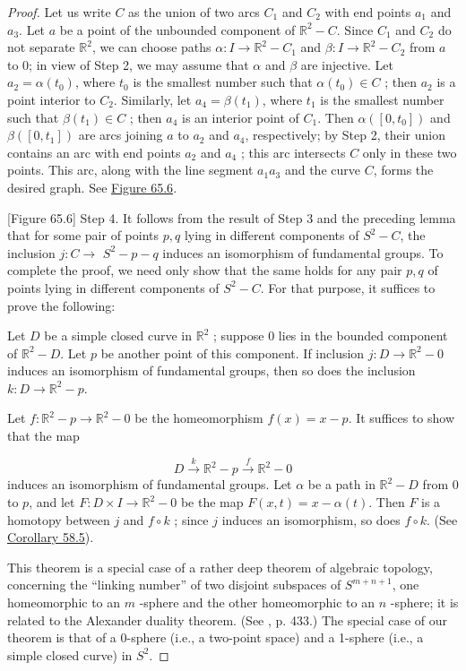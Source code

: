 \begin{proof}
Let us write \(C\) as the union of two arcs \(C_{1}\) and \(C_{2}\) with end points \(a_{1}\) and \(a_{3}\). Let \(a\) be a point of the unbounded component of \(\mathbb{R}^{2} - C\). Since \(C_{1}\) and \(C_{2}\) do not separate \(\mathbb{R}^{2}\), we can choose paths \(\alpha : I \rightarrow {\mathbb{R}}^{2} - C_{1}\) and \(\beta : I \rightarrow {\mathbb{R}}^{2} - C_{2}\) from \(a\) to 0; in view of Step 2, we may assume that \(\alpha\) and \(\beta\) are injective. Let \(a_{2} = \alpha ( t_{0})\), where \(t_{0}\) is the smallest number such that \(\alpha ( t_{0}) \in C\) ; then \(a_{2}\) is a point interior to \(C_{2}\). Similarly, let \(a_{4} = \beta ( t_{1})\), where \(t_{1}\) is the smallest number such that \(\beta ( t_{1}) \in C\) ; then \(a_{4}\) is an interior point of \(C_{1}\). Then \(\alpha ( [ {0,t_{0}}] )\) and \(\beta ( [ {0,t_{1}}] )\) are arcs joining \(a\) to \(a_{2}\) and \(a_{4}\), respectively; by Step 2, their union contains an arc with end points \(a_{2}\) and \(a_{4}\) ; this arc intersects \(C\) only in these two points. This arc, along with the line segment \(a_{1}a_{3}\) and the curve \(C\), forms the desired graph. See \hyperref[fig:65.6]{Figure 65.6}.

[Figure 65.6]
Step 4. It follows from the result of Step 3 and the preceding lemma that for some pair of points \(p,q\) lying in different components of \(S^{2} - C\), the inclusion \(j : C \rightarrow\) \(S^{2} - p - q\) induces an isomorphism of fundamental groups. To complete the proof, we need only show that the same holds for any pair \(p,q\) of points lying in different components of \(S^{2} - C\). For that purpose, it suffices to prove the following:

Let \(D\) be a simple closed curve in \(\mathbb{R}^{2}\) ; suppose 0 lies in the bounded component of \(\mathbb{R}^{2} - D\). Let \(p\) be another point of this component. If inclusion \(j : D \rightarrow {\mathbb{R}}^{2} - 0\) induces an isomorphism of fundamental groups, then so does the inclusion \(k : D \rightarrow {\mathbb{R}}^{2} - p\).

Let \(f : \mathbb{R}^{2} - p \rightarrow {\mathbb{R}}^{2} - 0\) be the homeomorphism \(f(x) = x - p\). It suffices to show that the map

\[
D\overset{k}{ \rightarrow }\mathbb{R}^{2} - p\overset{f}{ \rightarrow }\mathbb{R}^{2} - 0
\]
induces an isomorphism of fundamental groups. Let \(\alpha\) be a path in \(\mathbb{R}^{2} - D\) from 0 to \(p\), and let \(F : D \times I \rightarrow {\mathbb{R}}^{2} - 0\) be the map \(F( {x,t}) = x - \alpha ( t)\). Then \(F\) is a homotopy between \(j\) and \(f \circ k\) ; since \(j\) induces an isomorphism, so does \(f \circ k\). (See \hyperref[cor:58.5]{Corollary 58.5}).

This theorem is a special case of a rather deep theorem of algebraic topology, concerning the ``linking number'' of two disjoint subspaces of \(S^{m + n + 1}\), one homeomorphic to an \(m\) -sphere and the other homeomorphic to an \(n\) -sphere; it is related to the Alexander duality theorem. (See \cite{Munkres1993}, p. 433.) The special case of our theorem is that of a 0-sphere (i.e., a two-point space) and a 1-sphere (i.e., a simple closed curve) in \(S^{2}\).
\end{proof}

